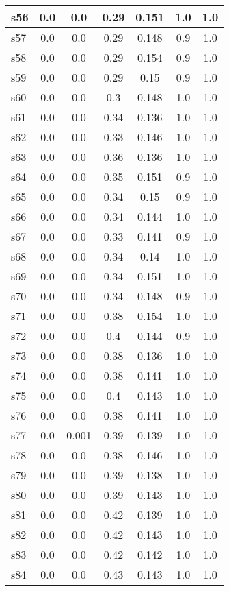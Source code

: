 \documentclass{article}
\begin{document}
\begin{tabular}{|l|c|c|c|c|c|c|}
\hline
s56 &0.0 & 0.0 & 0.29 & 0.151 & 1.0 & 1.0\\
\hline
s57 &0.0 & 0.0 & 0.29 & 0.148 & 0.9 & 1.0\\
\hline
s58 &0.0 & 0.0 & 0.29 & 0.154 & 0.9 & 1.0\\
\hline
s59 &0.0 & 0.0 & 0.29 & 0.15 & 0.9 & 1.0\\
\hline
s60 &0.0 & 0.0 & 0.3 & 0.148 & 1.0 & 1.0\\
\hline
s61 &0.0 & 0.0 & 0.34 & 0.136 & 1.0 & 1.0\\
\hline
s62 &0.0 & 0.0 & 0.33 & 0.146 & 1.0 & 1.0\\
\hline
s63 &0.0 & 0.0 & 0.36 & 0.136 & 1.0 & 1.0\\
\hline
s64 &0.0 & 0.0 & 0.35 & 0.151 & 0.9 & 1.0\\
\hline
s65 &0.0 & 0.0 & 0.34 & 0.15 & 0.9 & 1.0\\
\hline
s66 &0.0 & 0.0 & 0.34 & 0.144 & 1.0 & 1.0\\
\hline
s67 &0.0 & 0.0 & 0.33 & 0.141 & 0.9 & 1.0\\
\hline
s68 &0.0 & 0.0 & 0.34 & 0.14 & 1.0 & 1.0\\
\hline
s69 &0.0 & 0.0 & 0.34 & 0.151 & 1.0 & 1.0\\
\hline
s70 &0.0 & 0.0 & 0.34 & 0.148 & 0.9 & 1.0\\
\hline
s71 &0.0 & 0.0 & 0.38 & 0.154 & 1.0 & 1.0\\
\hline
s72 &0.0 & 0.0 & 0.4 & 0.144 & 0.9 & 1.0\\
\hline
s73 &0.0 & 0.0 & 0.38 & 0.136 & 1.0 & 1.0\\
\hline
s74 &0.0 & 0.0 & 0.38 & 0.141 & 1.0 & 1.0\\
\hline
s75 &0.0 & 0.0 & 0.4 & 0.143 & 1.0 & 1.0\\
\hline
s76 &0.0 & 0.0 & 0.38 & 0.141 & 1.0 & 1.0\\
\hline
s77 &0.0 & 0.001 & 0.39 & 0.139 & 1.0 & 1.0\\
\hline
s78 &0.0 & 0.0 & 0.38 & 0.146 & 1.0 & 1.0\\
\hline
s79 &0.0 & 0.0 & 0.39 & 0.138 & 1.0 & 1.0\\
\hline
s80 &0.0 & 0.0 & 0.39 & 0.143 & 1.0 & 1.0\\
\hline
s81 &0.0 & 0.0 & 0.42 & 0.139 & 1.0 & 1.0\\
\hline
s82 &0.0 & 0.0 & 0.42 & 0.143 & 1.0 & 1.0\\
\hline
s83 &0.0 & 0.0 & 0.42 & 0.142 & 1.0 & 1.0\\
\hline
s84 &0.0 & 0.0 & 0.43 & 0.143 & 1.0 & 1.0\\

\end{tabular}
\end{document}
